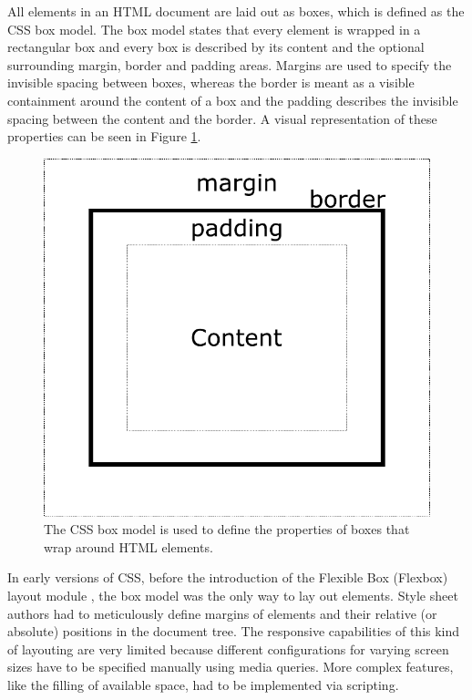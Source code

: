 All elements in an HTML document are laid out as boxes, which is defined as the CSS box model.
The box model states that every element is wrapped in a rectangular box and every box is described by its content and the optional surrounding margin, border and padding areas.
Margins are used to specify the invisible spacing between boxes, whereas the border is meant as a visible containment around the content of a box and the padding describes the invisible spacing between the content and the border. 
A visual representation of these properties can be seen in Figure \ref{fig:BoxModel}.

\begin{figure}[tp]
\centering
\includegraphics[keepaspectratio,width=\linewidth,height=\fullh / 4]{diagrams/box-model.pdf}
\caption[CSS Box Model]{
  The CSS box model is used to define the properties of boxes that wrap around HTML elements.
}
\label{fig:BoxModel}
\end{figure}

In early versions of CSS, before the introduction of the Flexible Box (Flexbox) layout module \parencite{CSSFlexboxFirstDraft}, the box model was the only way to lay out elements. 
Style sheet authors had to meticulously define margins of elements and their relative (or absolute) positions in the document tree. 
The responsive capabilities of this kind of layouting are very limited because different configurations for varying screen sizes have to be specified manually using media queries.
More complex features, like the filling of available space, had to be implemented via scripting.


